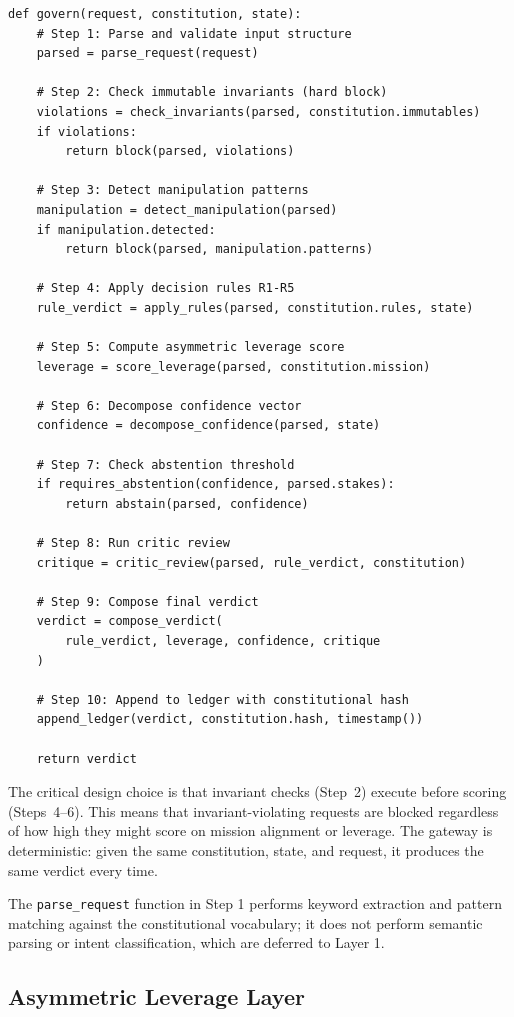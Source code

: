 \documentclass[11pt,a4paper]{article}
\begin{document}
\begin{lstlisting}[caption={The ten-step governance pipeline.},label={lst:pipeline}]
def govern(request, constitution, state):
    # Step 1: Parse and validate input structure
    parsed = parse_request(request)

    # Step 2: Check immutable invariants (hard block)
    violations = check_invariants(parsed, constitution.immutables)
    if violations:
        return block(parsed, violations)

    # Step 3: Detect manipulation patterns
    manipulation = detect_manipulation(parsed)
    if manipulation.detected:
        return block(parsed, manipulation.patterns)

    # Step 4: Apply decision rules R1-R5
    rule_verdict = apply_rules(parsed, constitution.rules, state)

    # Step 5: Compute asymmetric leverage score
    leverage = score_leverage(parsed, constitution.mission)

    # Step 6: Decompose confidence vector
    confidence = decompose_confidence(parsed, state)

    # Step 7: Check abstention threshold
    if requires_abstention(confidence, parsed.stakes):
        return abstain(parsed, confidence)

    # Step 8: Run critic review
    critique = critic_review(parsed, rule_verdict, constitution)

    # Step 9: Compose final verdict
    verdict = compose_verdict(
        rule_verdict, leverage, confidence, critique
    )

    # Step 10: Append to ledger with constitutional hash
    append_ledger(verdict, constitution.hash, timestamp())

    return verdict
\end{lstlisting}

The critical design choice is that invariant checks (Step~2) execute before scoring (Steps~4--6). This means that invariant-violating requests are blocked regardless of how high they might score on mission alignment or leverage. The gateway is deterministic: given the same constitution, state, and request, it produces the same verdict every time.

The \texttt{parse\_request} function in Step 1 performs keyword extraction and pattern matching against the constitutional vocabulary; it does not perform semantic parsing or intent classification, which are deferred to Layer 1.

\subsection{Asymmetric Leverage Layer}
\end{document}
